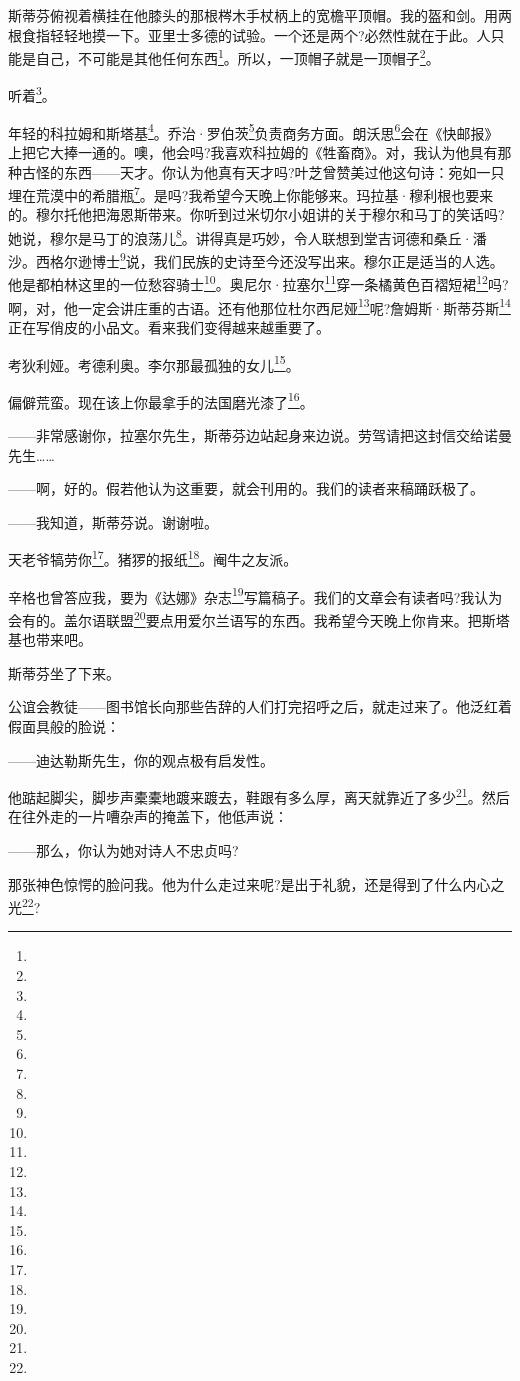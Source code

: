 \par 斯蒂芬俯视着横挂在他膝头的那根梣木手杖柄上的宽檐平顶帽。我的盔和剑。用两根食指轻轻地摸一下。亚里士多德的试验。一个还是两个?必然性就在于此。人只能是自己，不可能是其他任何东西\footnote{}。所以，一顶帽子就是一顶帽子\footnote{}。
\par 听着\footnote{}。
\par 年轻的科拉姆和斯塔基\footnote{}。乔治·罗伯茨\footnote{}负责商务方面。朗沃思\footnote{}会在《快邮报》上把它大捧一通的。噢，他会吗?我喜欢科拉姆的《牲畜商》。对，我认为他具有那种古怪的东西——天才。你认为他真有天才吗?叶芝曾赞美过他这句诗：宛如一只埋在荒漠中的希腊瓶\footnote{}。是吗?我希望今天晚上你能够来。玛拉基·穆利根也要来的。穆尔托他把海恩斯带来。你听到过米切尔小姐讲的关于穆尔和马丁的笑话吗?她说，穆尔是马丁的浪荡儿\footnote{}。讲得真是巧妙，令人联想到堂吉诃德和桑丘·潘沙。西格尔逊博士\footnote{}说，我们民族的史诗至今还没写出来。穆尔正是适当的人选。他是都柏林这里的一位愁容骑士\footnote{}。奥尼尔·拉塞尔\footnote{}穿一条橘黄色百褶短裙\footnote{}吗?啊，对，他一定会讲庄重的古语。还有他那位杜尔西尼娅\footnote{}呢?詹姆斯·斯蒂芬斯\footnote{}正在写俏皮的小品文。看来我们变得越来越重要了。
\par 考狄利娅。考德利奥。李尔那最孤独的女儿\footnote{}。
\par 偏僻荒蛮。现在该上你最拿手的法国磨光漆了\footnote{}。
\par ——非常感谢你，拉塞尔先生，斯蒂芬边站起身来边说。劳驾请把这封信交给诺曼先生……
\par ——啊，好的。假若他认为这重要，就会刊用的。我们的读者来稿踊跃极了。
\par ——我知道，斯蒂芬说。谢谢啦。
\par 天老爷犒劳你\footnote{}。猪猡的报纸\footnote{}。阉牛之友派。
\par 辛格也曾答应我，要为《达娜》杂志\footnote{}写篇稿子。我们的文章会有读者吗?我认为会有的。盖尔语联盟\footnote{}要点用爱尔兰语写的东西。我希望今天晚上你肯来。把斯塔基也带来吧。
\par 斯蒂芬坐了下来。
\par 公谊会教徒——图书馆长向那些告辞的人们打完招呼之后，就走过来了。他泛红着假面具般的脸说：
\par ——迪达勒斯先生，你的观点极有启发性。
\par 他踮起脚尖，脚步声橐橐地踱来踱去，鞋跟有多么厚，离天就靠近了多少\footnote{}。然后在往外走的一片嘈杂声的掩盖下，他低声说：
\par ——那么，你认为她对诗人不忠贞吗?
\par 那张神色惊愕的脸问我。他为什么走过来呢?是出于礼貌，还是得到了什么内心之光\footnote{}?
